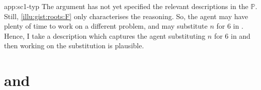 \begin{note}
\begin{dets}{app:sc1-typ}
    \noindent%
    The argument has not yet specified the relevant descriptions in the \tpro{} \(\mathbb{P}\).
    Still, \autoref{illu:gist:roots:F} only characterises the \agents{} reasoning.
    So, the agent may have plenty of time to work on a different problem, and may substitute \(n\) for \(6\) in \rootsConEq{}.
    Hence, I take a description which captures the agent substituting \(n\) for \(6\) in \rootsConEq{} and then working on the substitution is plausible.
  \end{dets}
\end{note}



\section{ and }
\label{sec:tcv3-requ1}


